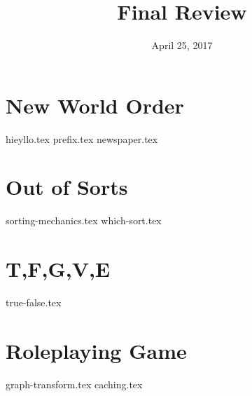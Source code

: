 \documentclass[11pt]{exam}
\title{Final Review}
\date{April 25, 2017}
\begin{document}
\maketitle

\section{New World Order}
\begin{questions}
{hieyllo.tex}
{prefix.tex}
{newspaper.tex}
\end{questions}

\pagebreak

\section{Out of Sorts}
\begin{questions}
{sorting-mechanics.tex}
{which-sort.tex}
\end{questions}

\pagebreak

\section{T,F,G,V,E}
\begin{questions}
{true-false.tex}
\end{questions}

\pagebreak

\section{Roleplaying Game}
\begin{questions}
{graph-transform.tex}
{caching.tex}
\end{questions}
\end{document}
